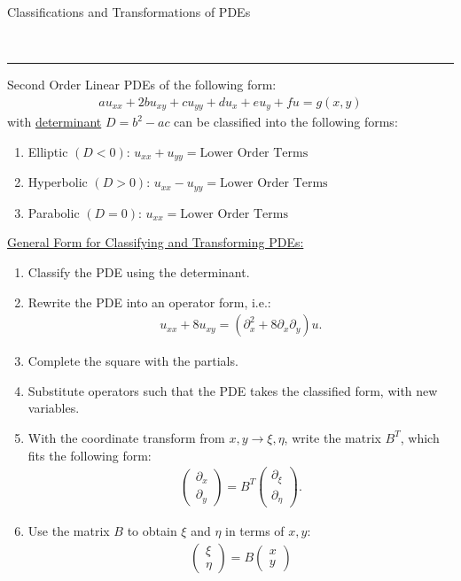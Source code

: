 \documentclass{article}
\newcommand{\header}[1]{\begin{large}\noindent #1\end{large}\\\rule{\textwidth}{0.5pt}}
\newcommand{\sheader}[1]{\underline{#1:}}
\newcommand{\ds}{\displaystyle}
\begin{document}
\header{Classifications and Transformations of PDEs} Second Order Linear PDEs 
of the following form:
\begin{align*}
    au_{xx} + 2bu_{xy} + cu_{yy} + du_x + eu_y + fu = g(x, y)
\end{align*}
with \underline{determinant} $D = b^2 - ac$ can be classified into the following forms:
\begin{enumerate}
    \item Elliptic $(D < 0)$:
    $
        \ds u_{xx} + u_{yy} = \textrm{Lower Order Terms}
    $
    \item Hyperbolic $(D > 0)$:
    $\ds
        u_{xx} - u_{yy} = \textrm{Lower Order Terms}
    $
    \item Parabolic $(D = 0)$:
    $\ds
        u_{xx} = \textrm{Lower Order Terms}
    $
\end{enumerate}
\pagebreak
\sheader{General Form for Classifying and Transforming PDEs}
\begin{enumerate}
    \item Classify the PDE using the determinant.
    \item Rewrite the PDE into an operator form, i.e.:
    \begin{align*}
        u_{xx} + 8u_{xy} = (\partial_x^2 + 8 \partial_x \partial_y) u.
    \end{align*}
    \item Complete the square with the partials.
    \item Substitute operators such that the PDE takes the classified form, with 
    new variables.
    \item With the coordinate transform from $x, y \to \xi, \eta$, 
    write the matrix $B^T$, which fits the following form:
    \begin{align*}
        \begin{pmatrix}
            \partial_x\\
            \partial_y
        \end{pmatrix}
        = B^T
        \begin{pmatrix}
            \partial_\xi\\
            \partial_\eta
        \end{pmatrix}.
    \end{align*}
    \item Use the matrix $B$ to obtain $\xi$ and $\eta$ in terms of $x, y$:
    \begin{align*}
        \begin{pmatrix}
            \xi\\\eta
        \end{pmatrix} = B
        \begin{pmatrix}
            x\\y
        \end{pmatrix}
    \end{align*}
\end{enumerate}
\end{document}
